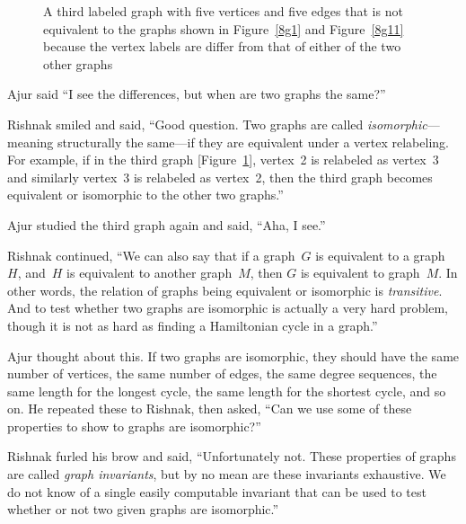 \begin{figure}
\begin{center}
\caption{A third labeled graph with five vertices and five edges that is not equivalent to the graphs shown in Figure~\ref{8g1} and Figure~\ref{8g11} because the vertex labels are differ from that of either of the two other graphs}\label{8g2}
\end{center}
\end{figure}

Ajur said ``I see the differences, but when are two graphs the same?''

Rishnak smiled and said, ``Good question. Two graphs are called \textit{isomorphic}---meaning structurally the same---if they are equivalent under a vertex relabeling. For example, if in the third graph [Figure~\ref{8g2}], vertex~2 is relabeled as vertex~3 and similarly vertex~3 is relabeled as vertex~2, then the third graph becomes equivalent or isomorphic to the other two graphs.''

Ajur studied the third graph again and said, ``Aha, I see.''

Rishnak continued, ``We can also say that if a graph~$G$ is equivalent to a graph~$H$, and~$H$ is equivalent to another graph~$M$, then $G$ is equivalent to graph~$M$. In other words, the relation of graphs being  equivalent or isomorphic is \textit{transitive}. And to test whether two graphs are isomorphic is actually a very hard problem, though it is not as hard as finding a Hamiltonian cycle in a graph.''

Ajur thought about this. If two graphs are isomorphic, they should have the same number of vertices, the same number of edges, the same degree sequences, the same length for the longest cycle, the same length for the shortest cycle, and so on. He repeated these to Rishnak, then asked, ``Can we use some of these properties to show to graphs are isomorphic?''

Rishnak furled his brow and said, ``Unfortunately not. These properties of graphs are called \textit{graph invariants}, but by no mean are these invariants exhaustive. We do not know of a single easily computable invariant that can be used to test whether or not two given graphs are isomorphic.''

